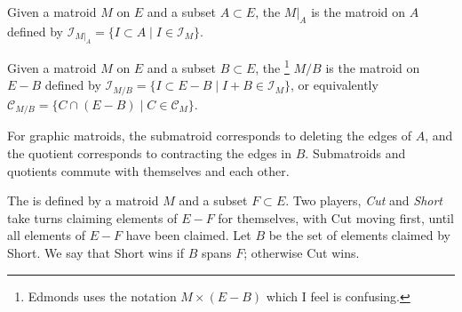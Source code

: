 \documentclass{article}
\newcommand*{\II}[0]{\mathcal{I}}
\newcommand*{\CC}[0]{\mathcal{C}}
\begin{document}
\begin{definition}
  Given a matroid $M$ on $E$ and a subset $A \subset E$, the  $M|_A$ is the matroid on $A$ defined by $\II_{M|_A} = \{I \subset A \mid I \in \II_M\}$.
\end{definition}

\begin{definition}
  Given a matroid $M$ on $E$ and a subset $B \subset E$, the \footnote{Edmonds uses the notation $M \times (E - B)$ which I feel is confusing.} $M/B$ is the matroid on $E - B$ defined by $\II_{M/B} = \{I \subset E - B \mid I + B \in \II_M\}$, or equivalently $\CC_{M/B} = \{C \cap (E - B) \mid C \in \CC_M\}$.
\end{definition}

For graphic matroids, the submatroid corresponds to deleting the edges of $A$, and the quotient corresponds to contracting the edges in $B$.  Submatroids and quotients commute with themselves and each other.

\begin{definition}
  The  is defined by a matroid $M$ and a subset $F \subset E$.
  Two players, \emph{Cut} and \emph{Short} take turns claiming elements of $E - F$ for themselves, with Cut moving first, until all elements of $E - F$ have been claimed.
  Let $B$ be the set of elements claimed by Short.
  We say that Short wins if $B$ spans $F$; otherwise Cut wins.
\end{definition}


\printbibliography
\end{document}
